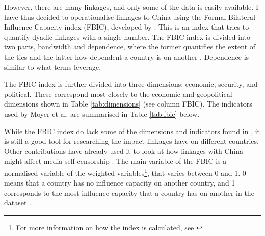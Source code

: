 However, there are many linkages, and only some of the data is easily available. I have thus decided to operationalise linkages to China using the Formal Bilateral Influence Capacity index (FBIC), developed by \citet{moyer_china-us_2021}. This is an index that tries to quantify dyadic linkages with a single number. The FBIC index is divided into two parts, bandwidth and dependence, where the former quantifies the extent of the ties and the latter how dependent a country is on another \citep[p. 7]{moyer_china-us_2021}. Dependence is similar to what \citep{levitsky_linkage_2006} terms leverage.

The FBIC index is further divided into three dimensions: economic, security, and political. These correspond most closely to the economic and geopolitical dimensions shown in Table \ref{tab:dimensions} (see column FBIC). The indicators used by Moyer et al. are summarised in Table \ref{tab:fbic} below.

While the FBIC index do lack some of the dimensions and indicators found in \citet{levitsky_linkage_2006}, it is still a good tool for researching the impact linkages have on different countries. Other contributions have already used it to look at how linkages with China might affect media self-censorship \citep{toettoe_foreign_2023}. The main variable of the FBIC is a normalised variable of the weighted variables\footnote{For more information on how the index is calculated, see \citet[pp. 26-31]{moyer_china-us_2021}}, that varies between 0 and 1. 0 means that a country has no influence capacity on another country, and 1 corresponds to the most influence capacity that a country has on another in the dataset \citep[p. 28]{moyer_china-us_2021}. 

